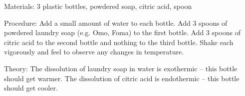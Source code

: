 \begin{multicols}{2}
\begin{description*}
\item[Materials:]{3 plastic bottles, powdered soap, citric acid, spoon}
\item[Procedure:]{Add a small amount of water to each bottle. Add 3 spoons of powdered laundry soap (e.g. Omo, Foma) to the first bottle. Add 3 spoons of citric acid to the second bottle and nothing to the third bottle. Shake each vigorously and feel to observe any changes in temperature.}
\item[Theory:]{The dissolution of laundry soap in water is exothermic -- this bottle should
get warmer. The dissolution of citric acid is endothermic -- this bottle should get cooler.}
\end{description*}
%

\end{multicols}
